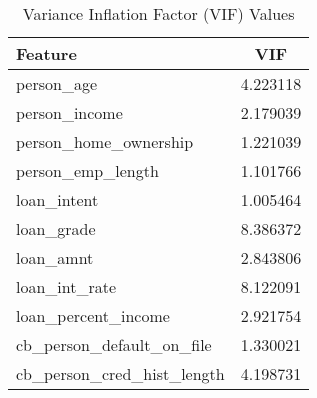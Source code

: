 \begin{table}[H]\centering
\caption{Variance Inflation Factor (VIF) Values}
\label{Table 4:vif_values}
\begin{tabular}{lc}
\toprule
Feature & VIF \\
\midrule
person_age & 4.223118 \\
person_income & 2.179039 \\
person_home_ownership & 1.221039 \\
person_emp_length & 1.101766 \\
loan_intent & 1.005464 \\
loan_grade & 8.386372 \\
loan_amnt & 2.843806 \\
loan_int_rate & 8.122091 \\
loan_percent_income & 2.921754 \\
cb_person_default_on_file & 1.330021 \\
cb_person_cred_hist_length & 4.198731 \\
\bottomrule
\end{tabular}
\end{table}
